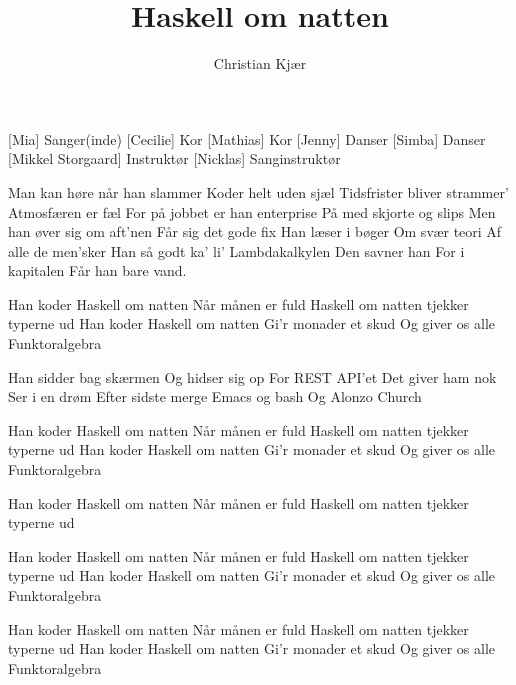 \documentclass[a4paper,11pt]{article}
\title{Haskell om natten}
\author{Christian Kjær}
\begin{document}
\maketitle

\begin{roles}
    [Mia] Sanger(inde)
    [Cecilie] Kor
    [Mathias] Kor
    [Jenny] Danser
    [Simba] Danser
    [Mikkel Storgaard] Instruktør
    [Nicklas] Sanginstruktør
\end{roles}


\begin{song}
Man kan høre når han slammer
Koder helt uden sjæl
Tidsfrister bliver strammer'
Atmosfæren er fæl
For på jobbet er han enterprise
På med skjorte og slips
Men han øver sig om aft'nen
Får sig det gode fix
Han læser i bøger
Om svær teori
Af alle de men'sker
Han så godt ka' li'
Lambdakalkylen
Den savner han
For i kapitalen
Får han bare vand.

Han koder Haskell om natten
Når månen er fuld
Haskell om natten tjekker typerne ud
Han koder Haskell om natten
Gi'r monader et skud
Og giver os alle
Funktoralgebra

Han sidder bag skærmen
Og hidser sig op
For REST API'et
Det giver ham nok
Ser i en drøm
Efter sidste merge
Emacs og bash
Og Alonzo Church

Han koder Haskell om natten
Når månen er fuld
Haskell om natten tjekker typerne ud
Han koder Haskell om natten
Gi'r monader et skud
Og giver os alle
Funktoralgebra

Han koder Haskell om natten
Når månen er fuld
Haskell om natten tjekker typerne ud


Han koder Haskell om natten
Når månen er fuld
Haskell om natten tjekker typerne ud
Han koder Haskell om natten
Gi'r monader et skud
Og giver os alle
Funktoralgebra

Han koder Haskell om natten
Når månen er fuld
Haskell om natten tjekker typerne ud
Han koder Haskell om natten
Gi'r monader et skud
Og giver os alle
Funktoralgebra
\end{song}
\end{document}
